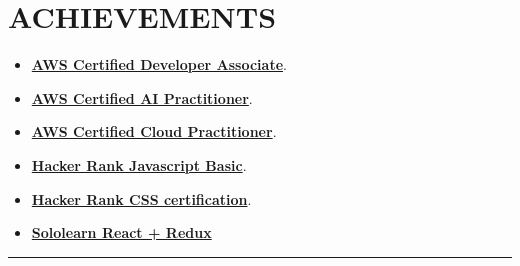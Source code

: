 \documentclass[a4paper]{article}
\newcommand{\sectionline}{
\begin{center}
\vspace{-9pt}
\rule{1\textwidth}{0.5pt}
\end{center}
\vspace{1pt}
}
\begin{document}
\section*{ACHIEVEMENTS}
\begin{itemize}
\item \href{https://www.credly.com/earner/earned/share/b3cbb0c0-3e79-44e8-9014-0f037b0dc12c} {\bf AWS Certified Developer Associate}.
\item \href{https://www.credly.com/badges/ed0f0afe-4927-4488-86b0-3956fb83e37c/linked_in_profile}{\bf AWS Certified AI Practitioner}.
\item \href{https://www.credly.com/badges/50f28d0d-2647-4f37-b78e-6bf5ce002d4e/linked_in_profile}{\bf AWS Certified Cloud Practitioner}.
\item \href{https://www.hackerrank.com/certificates/e8c2450c7b38/}{\bf Hacker Rank Javascript Basic}.
\item \href{https://www.hackerrank.com/certificates/3348c7124f7d} {\bf Hacker Rank CSS certification}.
\item \href{https://www.sololearn.com/en/certificates/CT-KRZNT5XO} {\bf Sololearn React + Redux}
\end{itemize}

\sectionline
\end{document}
